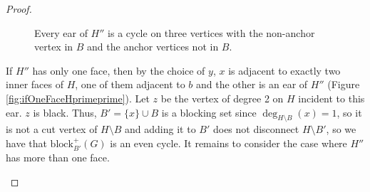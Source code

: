 \documentclass{patmorin}
\newcommand{\block}{\mathrm{block}}
\begin{document}
\begin{proof}
\begin{figure}[!ht]
  \centering
  
  \caption{Every ear of $H''$ is a cycle on three vertices with the non-anchor vertex in $B$ and the anchor vertices not in $B$.}
  \label{fig:everyEarIsThreeCycle}
  
\end{figure}

If $H''$ has only one face, then by the choice of $y$, $x$ is adjacent to exactly two inner faces of $H$, one of them adjacent to $b$ and the other is an ear of $H''$ (Figure \ref{fig:ifOneFaceHprimeprime}). Let $z$ be the vertex of degree 2 on $H$ incident to this ear. $z$ is black. Thus, $B'=\{x\} \cup B$ is a blocking set since $\deg_{H\setminus B}(x)=1$, so it is not a cut vertex of $H\setminus B$ and adding it to $B'$ does not disconnect $H\setminus B'$, so we have that $\block_{B'}^+(G)$ is an even cycle. It remains to consider the case where $H''$ has more than one face.

\begin{figure}[!ht]
  \centering
  
\end{figure}
\end{proof}
\end{document}
